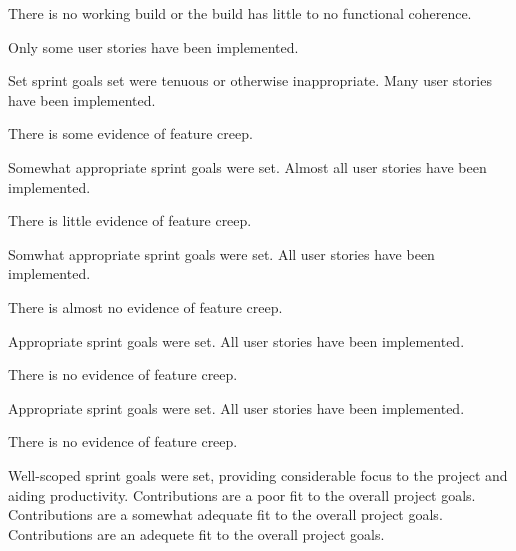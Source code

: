 \documentclass{../../fal_assignment}
\begin{document}
\rubricyearthree

\begin{markingrubric}
%
        \grade \fail There is no working build or the build has little to no functional coherence.
	\par Only some user stories have been implemented.
            \par Set sprint goals set were tenuous or otherwise inappropriate.
        \grade Many user stories have been implemented.
            \par There is some evidence of feature creep.
            \par Somewhat appropriate sprint goals were set.
        \grade Almost all user stories have been implemented.
            \par There is little evidence of feature creep.
            \par Somwhat appropriate sprint goals were set.
        \grade All user stories have been implemented.
            \par There is almost no evidence of feature creep.
            \par Appropriate sprint goals were set.
        \grade All user stories have been implemented.
            \par There is no evidence of feature creep.
            \par Appropriate sprint goals were set.
        \grade All user stories have been implemented.
            \par There is no evidence of feature creep.
            \par Well-scoped sprint goals were set, providing considerable focus to the project and aiding productivity.
%
        \grade \fail Contributions are a poor fit to the overall project goals.
        \grade Contributions are a somewhat adequate fit to the overall project goals.       
        \grade Contributions are an adequete fit to the overall project goals.

\end{markingrubric}
\end{document}
